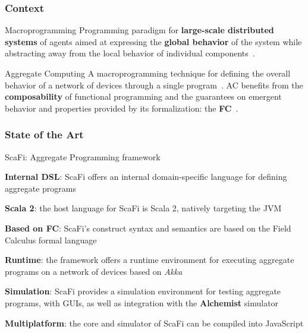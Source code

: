 \begin{frame}
    \titlepage
\end{frame}


\begin{frame}
    \frametitle{Context}
    \begin{block}{Macroprogramming}
        Programming paradigm for \textbf{large-scale distributed systems} of agents aimed at expressing the \textbf{global behavior} of the system while abstracting away from the local behavior of individual components~\cite{macroprogramming-state-of-the-art}.
    \end{block}
    \begin{block}{Aggregate Computing}
        A macroprogramming technique for defining the overall behavior of a network of devices through a single program~\cite{aggregate-programming}.
        \ac{AC} benefits from the \textbf{composability} of functional programming and the guarantees on emergent behavior and properties provided by its formalization: the \textbf{\ac{FC}}~\cite{fc}.
    \end{block}
\end{frame}

\begin{frame}
    \frametitle{State of the Art}
    \begin{blockitems}{ScaFi: Aggregate Programming framework}
        \item \textbf{Internal \ac{DSL}}: ScaFi offers an internal domain-specific language for defining aggregate programs~\cite{scafi}
        \item \textbf{Scala 2}: the host language for ScaFi is Scala 2, natively targeting the \ac{JVM}~\cite{scafi-thesis}
        \item \textbf{Based on \ac{FC}}: ScaFi's construct syntax and semantics are based on the Field Calculus formal language
        \item \textbf{Runtime}: the framework offers a runtime environment for executing aggregate programs on a network of devices based on \textit{Akka}
        \item \textbf{Simulation}: ScaFi provides a simulation environment for testing aggregate programs, with \acp{GUI}, as well as integration with the \textbf{Alchemist} simulator~\cite{alchemist,scafi-with-alchemist}
        \item \textbf{Multiplatform}: the core and simulator of ScaFi can be compiled into JavaScript
    \end{blockitems}
\end{frame}

